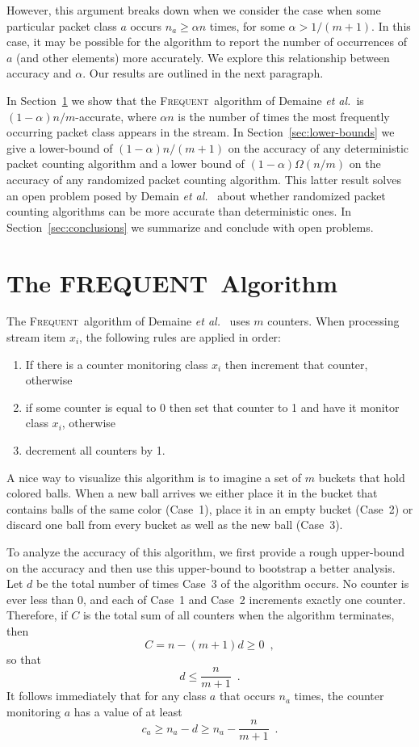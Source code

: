 \documentclass[charterfonts,lotsofwhite]{patmorin}
\newcommand{\frequent}{\textsc{Frequent}}
\newcommand{\FREQUENT}{\textsc{FREQUENT}}
\newcommand{\seclabel}[1]{\label{sec:#1}}
\newcommand{\secref}[1]{\mbox{Section~\ref{sec:#1}}}
\newcommand{\etal}{\emph{et al.}}
\begin{document}
However, this argument breaks down when we consider the case when some
particular packet class $a$ occurs $n_a\ge\alpha n$ times, for some
$\alpha > 1/(m+1)$. In this case, it may be possible for the algorithm
to report the number of occurrences of $a$ (and other elements) more
accurately.  We explore this relationship between accuracy and
$\alpha$.  Our results are outlined in the next paragraph.

In \secref{dlom} we show that the \frequent\ algorithm of Demaine
\etal\ is $(1-\alpha)n/m$-accurate, where $\alpha n$ is the number of
times the most frequently occurring packet class appears in the stream.
In \secref{lower-bounds} we give a lower-bound of $(1-\alpha)n/(m+1)$
on the accuracy of any deterministic packet counting algorithm and a
lower bound of $(1-\alpha)\Omega(n/m)$ on the accuracy of any
randomized packet counting algorithm.  This latter result solves an
open problem posed by Demain \etal\ \cite{dlom02} about whether
randomized packet counting algorithms can be more accurate than
deterministic ones.  In \secref{conclusions} we summarize and conclude
with open problems.

\section{The \FREQUENT\ Algorithm}\seclabel{dlom}

The \frequent\ algorithm of Demaine \etal\ \cite{dlom02} uses $m$
counters. When processing stream item $x_i$, the following rules are
applied in order:

\begin{enumerate}
\item If there is a counter monitoring class $x_i$ then increment
 	that counter, otherwise
\item if some counter is equal to 0 then set that counter to 1 and
	have it monitor class $x_i$, otherwise
\item decrement all counters by 1.
\end{enumerate}

A nice way to visualize this algorithm is to imagine a set of $m$
buckets that hold colored balls. When a new ball arrives we either
place it in the bucket that contains balls of the same color (Case~1),
place it in an empty bucket (Case~2) or discard one ball from every
bucket as well as the new ball (Case~3).

To analyze the accuracy of this algorithm, we first provide a rough
upper-bound on the accuracy and then use this upper-bound to bootstrap
a better analysis.  Let $d$ be the total number of times Case~3 of the
algorithm occurs.  No counter is ever less than 0, and each of Case~1
and Case~2 increments exactly one counter.  Therefore, if $C$ is the
total sum of all counters when the algorithm terminates, then
\[
      C = n - (m+1)d \ge 0 \enspace ,
\]
so that 
\[
 d\le \frac{n}{m+1} \enspace .
\]
It follows immediately that for any class $a$ that occurs $n_a$ times, the counter monitoring $a$ has a value of
at least
\[
     c_a \ge n_a - d \ge n_a - \frac{n}{m+1} \enspace .
\]
\end{document}
